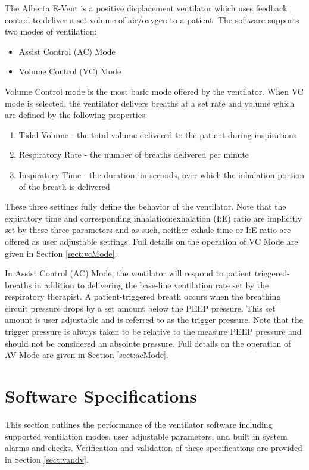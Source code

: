 \documentclass[]{article}
\begin{document}
The Alberta E-Vent is a positive displacement ventilator which uses feedback control to deliver a set volume of air/oxygen to a patient.  The software supports two modes of ventilation:
\begin{itemize}
	\item Assist Control (AC) Mode
	\item Volume Control (VC) Mode
\end{itemize}
Volume Control mode is the most basic mode offered by the ventilator.  When VC mode is selected, the ventilator delivers breaths at a set rate and volume which are defined by the following properties:
\begin{enumerate}
	\item Tidal Volume - the total volume delivered to the patient during inspirations
	\item Respiratory Rate - the number of breaths delivered per minute
	\item Inspiratory Time - the duration, in seconds, over which the inhalation portion of the breath is delivered
\end{enumerate}
These three settings fully define the behavior of the ventilator. Note that the expiratory time and corresponding inhalation:exhalation (I:E) ratio are implicitly set by these three parameters and as such, neither exhale time or I:E ratio are offered as user adjustable settings.  Full details on the operation of VC Mode are given in Section \ref{sect:vcMode}.

In Assist Control (AC) Mode, the ventilator will respond to patient triggered-breaths in addition to delivering the base-line ventilation rate set by the respiratory therapist.  A patient-triggered breath occurs when the breathing circuit pressure drops by a set amount below the PEEP pressure.  This set amount is user adjustable and is referred to as the trigger pressure.  Note that the trigger pressure is always taken to be relative to the measure PEEP pressure and should not be considered an absolute pressure.  Full details on the operation of AV Mode are given in Section \ref{sect:acMode}.

\clearpage
\section{Software Specifications}
\label{sect:specifications}

This section outlines the performance of the ventilator software including supported ventilation modes, user adjustable parameters, and built in system alarms and checks.  Verification and validation of these specifications are provided in Section \ref{sect:vandv}.
\end{document}
